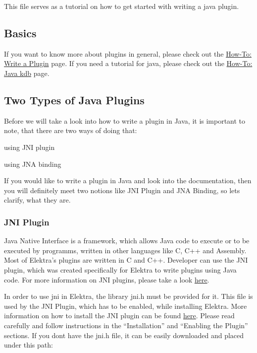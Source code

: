 This file serves as a tutorial on how to get started with writing a java plugin.

\subsection*{Basics}

If you want to know more about plugins in general, please check out the \hyperlink{doc_tutorials_plugins_md}{How-\/\+To\+: Write a Plugin} page. If you need a tutorial for java, please check out the \hyperlink{doc_tutorials_java-kdb_md}{How-\/\+To\+: Java kdb} page.

\subsection*{Two Types of Java Plugins}

Before we will take a look into how to write a plugin in Java, it is important to note, that there are two ways of doing that\+:


\begin{DoxyItemize}
\item using J\+NI plugin
\item using J\+NA binding
\end{DoxyItemize}

If you would like to write a plugin in Java and look into the documentation, then you will definitely meet two notions like {\ttfamily J\+NI Plugin} and {\ttfamily J\+NA Binding}, so let\textquotesingle{}s clarify, what they are.

\subsubsection*{J\+NI Plugin}

Java Native Interface is a framework, which allows Java code to execute or to be executed by programms, written in other languages like C, C++ and Assembly. Most of Elektra’s plugins are written in C and C++. Developer can use the J\+NI plugin, which was created specifically for Elektra to write plugins using Java code. For more information on J\+NI plugins, please take a look \hyperlink{md_src_plugins_jni_README_src_plugins_jni_README_md}{here}.

In order to use {\ttfamily jni} in Elektra, the library {\ttfamily jni.\+h} must be provided for it. This file is used by the J\+NI Plugin, which has to be enabled, while installing Elektra. More information on how to install the J\+NI plugin can be found \hyperlink{md_src_plugins_jni_README_src_plugins_jni_README_md}{here}. Please read carefully and follow instructions in the “\+Installation” and “\+Enabling the Plugin” sections. If you don\textquotesingle{}t have the {\ttfamily jni.\+h} file, it can be easily downloaded and placed under this path\+:


